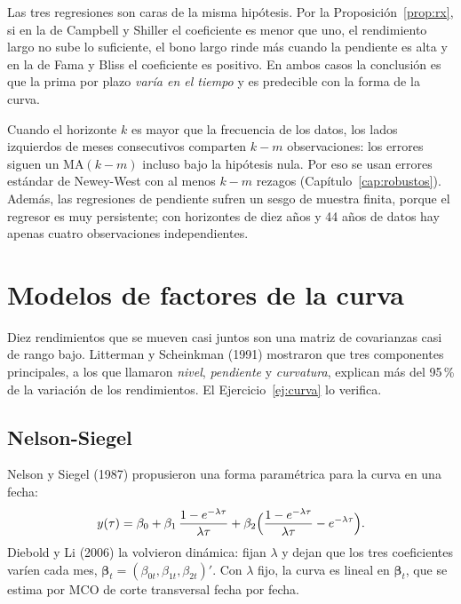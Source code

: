 Las tres regresiones son caras de la misma hipótesis. Por la Proposición~\ref{prop:rx}, si en la de Campbell y Shiller el
coeficiente es menor que uno, el rendimiento largo no sube lo suficiente, el bono largo rinde más cuando la pendiente es
alta y en la de Fama y Bliss el coeficiente es positivo. En ambos casos la conclusión es que la prima por plazo
\emph{varía en el tiempo} y es predecible con la forma de la curva.

\begin{observacion}
Cuando el horizonte $k$ es mayor que la frecuencia de los datos, los lados izquierdos de meses consecutivos comparten
$k-m$ observaciones: los errores siguen un MA$(k-m)$ incluso bajo la hipótesis nula. Por eso se usan errores estándar de
Newey-West con al menos $k-m$ rezagos (Capítulo~\ref{cap:robustos}). Además, las regresiones de pendiente sufren un sesgo
de muestra finita, porque el regresor es muy persistente; con horizontes de diez años y 44 años de datos hay apenas cuatro
observaciones independientes.
\end{observacion}

\section{Modelos de factores de la curva}

Diez rendimientos que se mueven casi juntos son una matriz de covarianzas casi de rango bajo. Litterman y Scheinkman
(1991) mostraron que tres componentes principales, a los que llamaron \emph{nivel}, \emph{pendiente} y \emph{curvatura},
explican más del 95\,\% de la variación de los rendimientos. El Ejercicio~\ref{ej:curva} lo verifica.

\subsection*{Nelson-Siegel}
Nelson y Siegel (1987) propusieron una forma paramétrica para la curva en una fecha:
\[
  y(\tau)=\beta_0+\beta_1\,\frac{1-e^{-\lambda\tau}}{\lambda\tau}
          +\beta_2\Bigl(\frac{1-e^{-\lambda\tau}}{\lambda\tau}-e^{-\lambda\tau}\Bigr).
\]
Diebold y Li (2006) la volvieron dinámica: fijan $\lambda$ y dejan que los tres coeficientes varíen cada mes,
$\boldsymbol\beta_t=(\beta_{0t},\beta_{1t},\beta_{2t})'$. Con $\lambda$ fijo, la curva es lineal en $\boldsymbol\beta_t$, que se
estima por MCO de corte transversal fecha por fecha.

